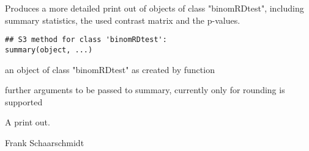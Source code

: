 \begin{Description}\relax
Produces a more detailed print out of objects of class "binomRDtest",
including summary statistics,
the used contrast matrix and the p-values.
\end{Description}
\begin{Usage}
\begin{verbatim}
## S3 method for class 'binomRDtest':
summary(object, ...)
\end{verbatim}
\end{Usage}
\begin{Arguments}
\begin{ldescription}
\item[\code{object}] an object of class "binomRDtest" as created by function   
\item[\code{...}] further arguments to be passed to summary, currently only  for rounding is supported 
\end{ldescription}
\end{Arguments}
\begin{Value}
A print out.
\end{Value}
\begin{Author}\relax
Frank Schaarschmidt
\end{Author}

